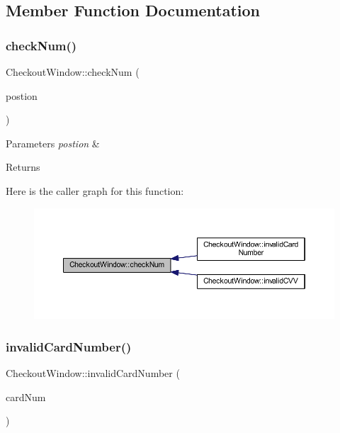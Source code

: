 \subsection{Member Function Documentation}
\mbox{\label{class_checkout_window_ad3d3908e0916fbb5abdc134d7d1bcb03}} 
\subsubsection{\texorpdfstring{check\+Num()}{checkNum()}}
{\footnotesize\ttfamily Checkout\+Window\+::check\+Num (\begin{DoxyParamCaption}\item[{Q\+Char}]{postion }\end{DoxyParamCaption})}


\begin{DoxyParams}{Parameters}
{\em postion} & \\
\hline
\end{DoxyParams}
\begin{DoxyReturn}{Returns}

\end{DoxyReturn}
Here is the caller graph for this function\+:
\nopagebreak
\begin{figure}[H]
\begin{center}
\leavevmode
\includegraphics[width=350pt]{class_checkout_window_ad3d3908e0916fbb5abdc134d7d1bcb03_icgraph}
\end{center}
\end{figure}
\mbox{\label{class_checkout_window_a28612fc41a4491136ae4327363cbeb74}} 
\subsubsection{\texorpdfstring{invalid\+Card\+Number()}{invalidCardNumber()}}
{\footnotesize\ttfamily Checkout\+Window\+::invalid\+Card\+Number (\begin{DoxyParamCaption}\item[{Q\+String}]{card\+Num }\end{DoxyParamCaption})}


